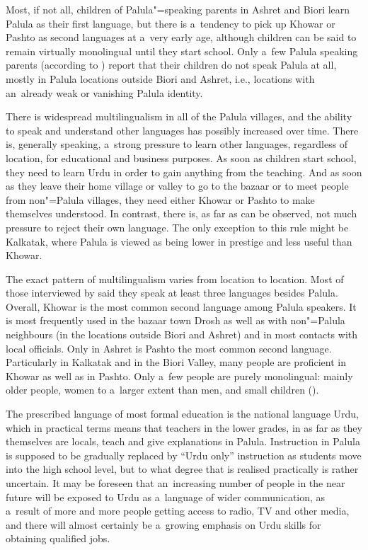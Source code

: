 Most, if not all, children of Palula"=speaking parents in Ashret and Biori learn Palula as their first language, but there is a~tendency to pick up Khowar or Pashto as second languages at a~very early age, although children can be said to remain virtually monolingual until they start school. Only a~few Palula speaking parents (according to \citealt{decker1992a}) report that their children do not speak Palula at all, mostly in Palula locations outside Biori and Ashret, i.e., locations with an~already weak or vanishing Palula identity. 


\largerpage[-1]
There is widespread multilingualism in all of the Palula villages, and the ability to speak and understand other languages has possibly increased over time. There is, generally speaking, a~strong pressure to learn other languages, regardless of location, for educational and business purposes. As soon as children start school, they need to learn Urdu in order to gain anything from the teaching. And as soon as they leave their home village or valley to go to the bazaar or to meet people from non"=Palula villages, they need either Khowar or Pashto to make themselves understood. In contrast, there is, as far as can be observed, not much pressure to reject their own language. The only exception to this rule might be Kalkatak, where Palula is viewed as being lower in prestige and less useful than Khowar.

\largerpage
The exact pattern of multilingualism varies from location to location. Most of those interviewed by \citet{decker1992a} said they speak at least three languages besides Palula. Overall, Khowar is the most common second language among Palula speakers. It is most frequently used in the bazaar town Drosh as well as with non"=Palula neighbours (in the locations outside Biori and Ashret) and in most contacts with local officials. Only in Ashret is Pashto the most common second language. Particularly in Kalkatak and in the Biori Valley, many people are proficient in Khowar as well as in Pashto. Only a~few people are purely monolingual: mainly older people, women to a~larger extent than men, and small children (\citealt{decker1992a}). 


The prescribed language of most formal education is the national language Urdu, which in practical terms means that teachers in the lower grades, in as far as they themselves are locals, teach and give explanations in Palula. Instruction in Palula is supposed to be gradually replaced by ``Urdu only'' instruction as students move into the high school level, but to what degree that is realised practically is rather uncertain. It may be foreseen that an~increasing number of people in the near future will be exposed to Urdu as a~language of wider communication, as a~result of more and more people getting access to radio, TV and other media, and there will almost certainly be a~growing emphasis on Urdu skills for obtaining qualified jobs.


